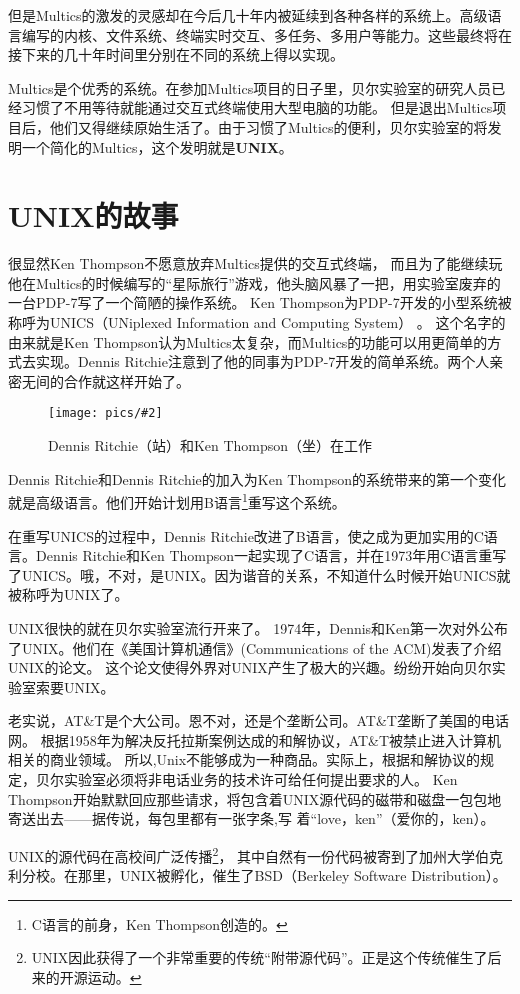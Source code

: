 \documentclass[amstex]{ctexbook}
\newcommand{\chatu}[3][0.35]{%
\begin{figure}[h]%
\centering%
\texttt{[image: pics/\#2]}%
\caption{#3\label{fig:#2}}%
\end{figure}%
}
\begin{document}
但是Multics的激发的灵感却在今后几十年内被延续到各种各样的系统上。高级语言编写的内核、文件系统、终端实时交互、多任务、多用户等能力。这些最终将在接下来的几十年时间里分别在不同的系统上得以实现。

Multics是个优秀的系统。在参加Multics项目的日子里，贝尔实验室的研究人员已经习惯了不用等待就能通过交互式终端使用大型电脑的功能。
但是退出Multics项目后，他们又得继续原始生活了。由于习惯了Multics的便利，贝尔实验室的将发明一个简化的Multics，这个发明就是\textbf{UNIX}。

\section{UNIX的故事}

很显然Ken Thompson不愿意放弃Multics提供的交互式终端，
而且为了能继续玩他在Multics的时候编写的“星际旅行”游戏，他头脑风暴了一把，用实验室废弃的一台PDP-7写了一个简陋的操作系统。
Ken Thompson为PDP-7开发的小型系统被称呼为UNICS（UNiplexed Information and Computing System） 。 这个名字的由来就是Ken Thompson认为Multics太复杂，而Multics的功能可以用更简单的方式去实现。Dennis Ritchie注意到了他的同事为PDP-7开发的简单系统。两个人亲密无间的合作就这样开始了。

\chatu[0.2]{KandRwithPDP7}{Dennis Ritchie（站）和Ken Thompson（坐）在工作}

Dennis Ritchie和Dennis Ritchie的加入为Ken Thompson的系统带来的第一个变化就是高级语言。他们开始计划用B语言\footnote{C语言的前身，Ken Thompson创造的。}重写这个系统。

在重写UNICS的过程中，Dennis Ritchie改进了B语言，使之成为更加实用的C语言。Dennis Ritchie和Ken Thompson一起实现了C语言，并在1973年用C语言重写了UNICS。哦，不对，是UNIX。因为谐音的关系，不知道什么时候开始UNICS就被称呼为UNIX了。

UNIX很快的就在贝尔实验室流行开来了。
1974年，Dennis和Ken第一次对外公布了UNIX。他们在《美国计算机通信》(Communications of the ACM)发表了介绍UNIX的论文。
这个论文使得外界对UNIX产生了极大的兴趣。纷纷开始向贝尔实验室索要UNIX。

老实说，AT\&T是个大公司。恩不对，还是个垄断公司。AT\&T垄断了美国的电话网。
根据1958年为解决反托拉斯案例达成的和解协议，AT\&T被禁止进入计算机相关的商业领域。
所以,Unix不能够成为一种商品。实际上，根据和解协议的规定，贝尔实验室必须将非电话业务的技术许可给任何提出要求的人。
Ken Thompson开始默默回应那些请求，将包含着UNIX源代码的磁带和磁盘一包包地寄送出去——据传说，每包里都有一张字条,写
着“love，ken”（爱你的，ken）。

UNIX的源代码在高校间广泛传播\footnote{UNIX因此获得了一个非常重要的传统“附带源代码”。正是这个传统催生了后来的开源运动。}，
其中自然有一份代码被寄到了加州大学伯克利分校。在那里，UNIX被孵化，催生了BSD（Berkeley Software Distribution）。
\end{document}
